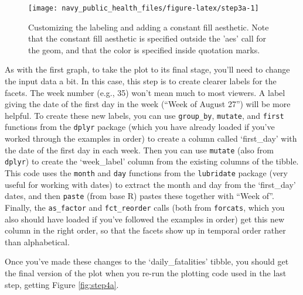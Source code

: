 \documentclass[]{tufte-book}
\begin{document}
\begin{figure}
\texttt{[image: navy\_public\_health\_files/figure-latex/step3a-1]} \caption[Customizing the labeling and adding a constant fill aesthetic]{Customizing the labeling and adding a constant fill aesthetic. Note that the constant fill aesthetic is specified outside the 'aes' call for the geom, and that the color is specified inside quotation marks.}\label{fig:step3a}
\end{figure}

As with the first graph, to take the plot to its final stage, you'll need to
change the input data a bit. In this case, this step is to create clearer labels for
the facets. The week number (e.g., 35) won't mean much to most viewers. A label giving
the date of the first day in the week (``Week of August 27'') will be more helpful.
To create these new labels, you can use \texttt{group\_by}, \texttt{mutate}, and \texttt{first} functions
from the \texttt{dplyr} package (which you have already loaded if you've worked through
the examples in order) to create a column called `first\_day' with the date of the
first day in each week. Then you can use \texttt{mutate} (also from \texttt{dplyr}) to create the
`week\_label' column from the existing columns of the tibble. This code uses the
\texttt{month} and \texttt{day} functions from the \texttt{lubridate} package (very useful for
working with dates) \citep{R-lubridate} to extract the month and day from the `first\_day'
dates, and then \texttt{paste} (from base R) pastes these together with ``Week of''.
Finally, the \texttt{as\_factor} and \texttt{fct\_reorder} calls (both from \texttt{forcats}, which you
also should have loaded if you've followed the examples in order) get this new
column in the right order, so that the facets show up in temporal order rather
than alphabetical.

Once you've made these changes to the `daily\_fatalities' tibble, you should get the
final version of the plot when you re-run the plotting code used in the last step,
getting Figure \ref{fig:step4a}.
\end{document}
